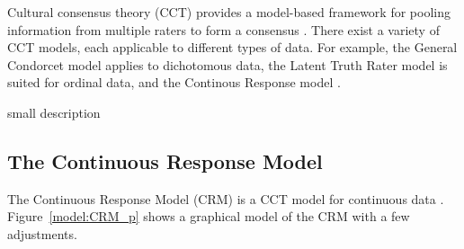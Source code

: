 \documentclass[a4paper,11pt]{article}
\begin{document}
Cultural consensus theory (CCT) provides a model-based framework for pooling information from multiple raters to form a consensus \parencite{anders2014cultural}.
There exist a variety of CCT models, each applicable to different types of data.
For example, the General Condorcet model \parencite{Batchelder1986statistical} applies to dichotomous data, the Latent Truth Rater model \parencite{Anders2015cultural} is suited for ordinal data, and the Continous Response model \parencite{anders2014cultural}.

small description
\subsection{The Continuous Response Model}
The Continuous Response Model (CRM) is a CCT model for continuous data \parencite{anders2014cultural}.
Figure~\ref{model:CRM_p} shows a graphical model of the CRM with a few adjustments.

\end{document}
